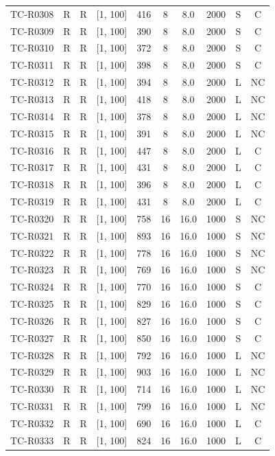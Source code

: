 \begin{longtable}{lccccccccc}
TC-R0308 & R & R & [1, 100] & 416 & 8 & 8.0 & 2000 & S & C \\
TC-R0309 & R & R & [1, 100] & 390 & 8 & 8.0 & 2000 & S & C \\
TC-R0310 & R & R & [1, 100] & 372 & 8 & 8.0 & 2000 & S & C \\
TC-R0311 & R & R & [1, 100] & 398 & 8 & 8.0 & 2000 & S & C \\
TC-R0312 & R & R & [1, 100] & 394 & 8 & 8.0 & 2000 & L & NC \\
TC-R0313 & R & R & [1, 100] & 418 & 8 & 8.0 & 2000 & L & NC \\
TC-R0314 & R & R & [1, 100] & 378 & 8 & 8.0 & 2000 & L & NC \\
TC-R0315 & R & R & [1, 100] & 391 & 8 & 8.0 & 2000 & L & NC \\
TC-R0316 & R & R & [1, 100] & 447 & 8 & 8.0 & 2000 & L & C \\
TC-R0317 & R & R & [1, 100] & 431 & 8 & 8.0 & 2000 & L & C \\
TC-R0318 & R & R & [1, 100] & 396 & 8 & 8.0 & 2000 & L & C \\
TC-R0319 & R & R & [1, 100] & 431 & 8 & 8.0 & 2000 & L & C \\
TC-R0320 & R & R & [1, 100] & 758 & 16 & 16.0 & 1000 & S & NC \\
TC-R0321 & R & R & [1, 100] & 893 & 16 & 16.0 & 1000 & S & NC \\
TC-R0322 & R & R & [1, 100] & 778 & 16 & 16.0 & 1000 & S & NC \\
TC-R0323 & R & R & [1, 100] & 769 & 16 & 16.0 & 1000 & S & NC \\
TC-R0324 & R & R & [1, 100] & 770 & 16 & 16.0 & 1000 & S & C \\
TC-R0325 & R & R & [1, 100] & 829 & 16 & 16.0 & 1000 & S & C \\
TC-R0326 & R & R & [1, 100] & 827 & 16 & 16.0 & 1000 & S & C \\
TC-R0327 & R & R & [1, 100] & 850 & 16 & 16.0 & 1000 & S & C \\
TC-R0328 & R & R & [1, 100] & 792 & 16 & 16.0 & 1000 & L & NC \\
TC-R0329 & R & R & [1, 100] & 903 & 16 & 16.0 & 1000 & L & NC \\
TC-R0330 & R & R & [1, 100] & 714 & 16 & 16.0 & 1000 & L & NC \\
TC-R0331 & R & R & [1, 100] & 799 & 16 & 16.0 & 1000 & L & NC \\
TC-R0332 & R & R & [1, 100] & 690 & 16 & 16.0 & 1000 & L & C \\
TC-R0333 & R & R & [1, 100] & 824 & 16 & 16.0 & 1000 & L & C \\

\end{longtable}
